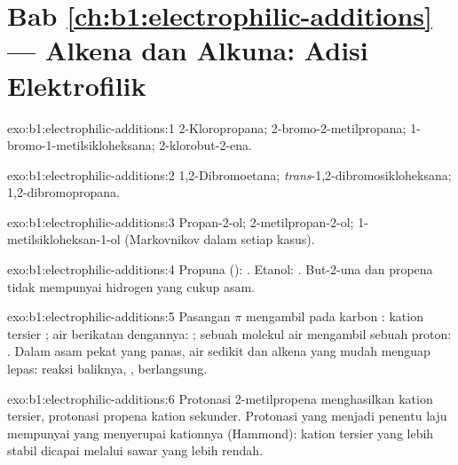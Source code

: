 \section*{Bab \ref{ch:b1:electrophilic-additions} --- Alkena dan Alkuna: Adisi Elektrofilik}

\begin{solution}{exo:b1:electrophilic-additions:1}
2-Kloropropana; 2-bromo-2-metilpropana; 1-bromo-1-metilsikloheksana;
2-klorobut-2-ena.
\end{solution}

\begin{solution}{exo:b1:electrophilic-additions:2}
1,2-Dibromoetana; \textit{trans}-1,2-dibromosikloheksana;
1,2-dibromopropana.
\end{solution}

\begin{solution}{exo:b1:electrophilic-additions:3}
Propan-2-ol; 2-metilpropan-2-ol; 1-metilsikloheksan-1-ol (Markovnikov
dalam setiap kasus).
\end{solution}

\begin{solution}{exo:b1:electrophilic-additions:4}
Propuna (): . Etanol:
. But-2-una dan propena tidak
mempunyai hidrogen yang cukup asam.
\end{solution}

\begin{solution}{exo:b1:electrophilic-additions:5}
Pasangan $\pi$ mengambil  pada karbon : kation tersier
;  air berikatan dengannya:
; sebuah molekul air mengambil sebuah proton:
. Dalam asam pekat yang panas, air sedikit dan alkena yang
mudah menguap lepas: reaksi baliknya, , berlangsung.
\end{solution}

\begin{solution}{exo:b1:electrophilic-additions:6}
Protonasi 2-metilpropena menghasilkan kation tersier, protonasi propena
kation sekunder. Protonasi yang menjadi penentu laju mempunyai  yang menyerupai kationnya (Hammond): kation tersier yang lebih
stabil dicapai melalui sawar yang lebih rendah.
\end{solution}

